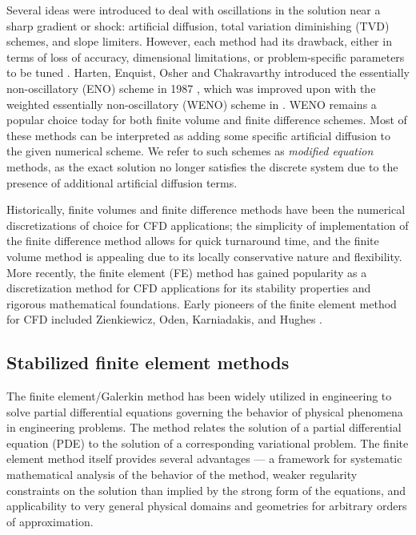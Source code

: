 Several ideas were introduced to deal with oscillations in the solution near a sharp gradient or shock: artificial diffusion, total variation diminishing (TVD) schemes, and slope limiters. However, each method had its drawback, either in terms of loss of accuracy, dimensional limitations, or problem-specific parameters to be tuned \cite{Shu:Lectures}. Harten, Enquist, Osher and Chakravarthy introduced the essentially non-oscillatory (ENO) scheme in 1987 \cite{ENO}, which was improved upon with the weighted essentially non-oscillatory (WENO) scheme in \cite{WENO}. WENO remains a popular choice today for both finite volume and finite difference schemes. Most of these methods can be interpreted as adding some specific artificial diffusion to the given numerical scheme.  We refer to such schemes as \emph{modified equation} methods, as the exact solution no longer satisfies the discrete system due to the presence of additional artificial diffusion terms.  

Historically, finite volumes and finite difference methods have been the numerical discretizations of choice for CFD applications; the simplicity of implementation of the finite difference method allows for quick turnaround time, and the finite volume method is appealing due to its locally conservative nature and flexibility. More recently, the finite element (FE) method has gained popularity as a discretization method for CFD applications for its stability properties and rigorous mathematical foundations. Early pioneers of the finite element method for CFD included Zienkiewicz, Oden, Karniadakis, and Hughes \cite{ChungCFDBook}.  

\subsection{Stabilized finite element methods}

The finite element/Galerkin method has been widely utilized in engineering to solve partial differential equations governing the behavior of physical phenomena in engineering problems.  The method relates the solution of a partial differential equation (PDE) to the solution of a corresponding variational problem. The finite element method itself provides several advantages --- a framework for systematic mathematical analysis of the behavior of the method, weaker regularity constraints on the solution than implied by the strong form of the equations, and applicability to very general physical domains and geometries for arbitrary orders of approximation. 

